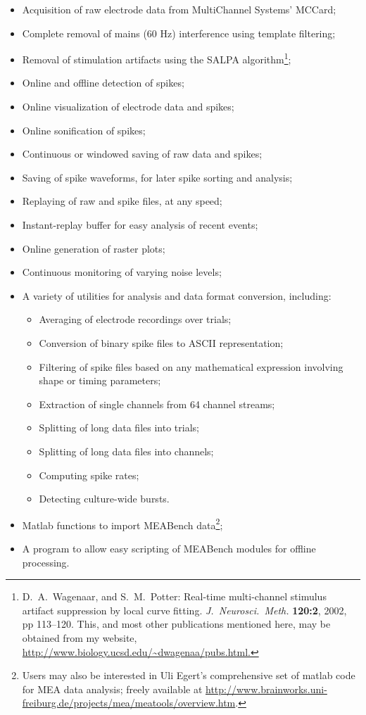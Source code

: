\documentclass[12pt,oneside]{book}
\def\meabench{{MEABench}\xspace}
\begin{document}
\begin{itemize}
\item Acquisition of raw electrode data from MultiChannel Systems' MCCard;
\item Complete removal of mains (60 Hz) interference using template
    filtering;
\item Removal of stimulation artifacts using the SALPA 
  algorithm\footnote{D.\ A.\ Wagenaar, and S.\ M.\ Potter: Real-time
  multi-channel stimulus artifact suppression by local curve fitting. 
  \emph{J.\ Neurosci.\ Meth.} {\bf 120:2}, 2002, pp 113--120. This, and
  most other publications mentioned here, may be obtained from my
  website, \url{http://www.biology.ucsd.edu/~dwagenaa/pubs.html.}};
\item Online and offline detection of spikes;
\item Online visualization of electrode data and spikes;
\item Online sonification of spikes;
\item Continuous or windowed saving of raw data and spikes;
\item Saving of spike waveforms, for later spike sorting and analysis;
\item Replaying of raw and spike files, at any speed;
\item Instant-replay buffer for easy analysis of recent events;
\item Online generation of raster plots;
\item Continuous monitoring of varying noise levels;
\item A variety of utilities for analysis and data format conversion,
    including:
\begin{itemize}
     \item Averaging of electrode recordings over trials;
     \item Conversion of binary spike files to ASCII representation;
     \item Filtering of spike files based on any mathematical expression
        involving shape or timing parameters;
     \item Extraction of single channels from 64 channel streams;
     \item Splitting of long data files into trials;
     \item Splitting of long data files into channels;
     \item Computing spike rates;
     \item Detecting culture-wide bursts.
\end{itemize}
\item Matlab functions to import \meabench data\footnote{Users may
	also be interested in Uli Egert's
    	comprehensive set of matlab code for MEA data
    	analysis; freely available at
    	\url{http://www.brainworks.uni-freiburg.de/projects/mea/meatools/overview.htm}.};
\item A program to allow easy scripting of \meabench modules for
offline processing.
\end{itemize}
  
\end{document}
